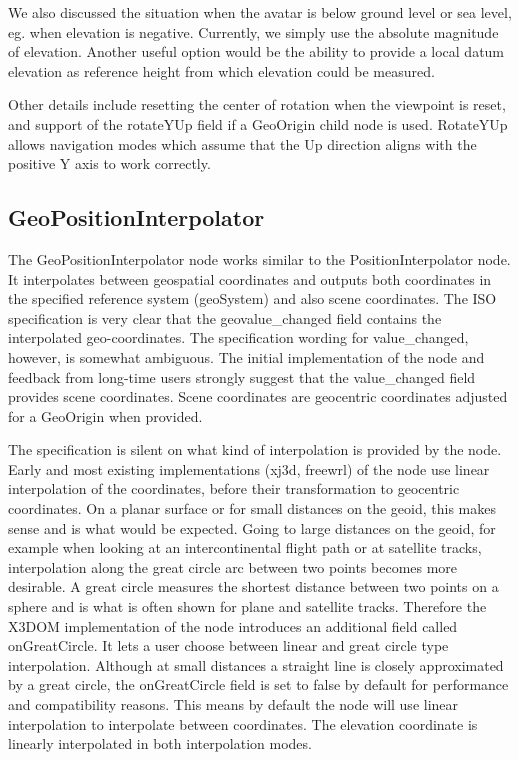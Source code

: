 \documentclass{acmsiggraph}                     %
\begin{document}
We also discussed the situation when the avatar is below ground level or sea level, eg. when elevation is negative. Currently, we simply use the absolute magnitude of elevation. Another useful option would be the ability to provide a local datum elevation as reference height from which elevation could be measured.

Other details include resetting the center of rotation when the viewpoint is reset, and support of the rotateYUp field if a GeoOrigin child node is used. RotateYUp allows navigation modes which assume that the Up direction aligns with the positive Y axis to work correctly.


\subsection{GeoPositionInterpolator}

The GeoPositionInterpolator node works similar to the PositionInterpolator node. It interpolates between geospatial coordinates and outputs both coordinates in the specified reference system (geoSystem) and also scene coordinates. The ISO specification is very clear that the geovalue\_changed field contains the interpolated geo-coordinates. The specification wording for value\_changed, however, is somewhat ambiguous. The initial implementation of the node \cite{reddy2000} and feedback from long-time users strongly suggest that the value\_changed field provides scene coordinates. Scene coordinates are geocentric coordinates adjusted for a GeoOrigin when provided.

The specification is silent on what kind of interpolation is provided by the node. Early \cite{reddy2000} and most existing implementations (xj3d, freewrl) of the node use linear interpolation of the coordinates, before their transformation to geocentric coordinates. On a planar surface or for small distances on the geoid, this makes sense and is what would be expected. Going to large distances on the geoid, for example when looking at an intercontinental flight path or at satellite tracks, interpolation along the great circle arc between two points becomes more desirable. A great circle measures the shortest distance between two points on a sphere and is what is often shown for plane and satellite tracks. Therefore the X3DOM implementation of the node introduces an additional field called onGreatCircle. It lets a user choose between linear and great circle type interpolation. Although at small distances a  straight line is closely approximated by a great circle, the onGreatCircle field is set to false by default for performance and compatibility reasons. This means by default the node will use linear interpolation to interpolate between coordinates. The elevation coordinate is linearly interpolated in both interpolation modes.
\end{document}
